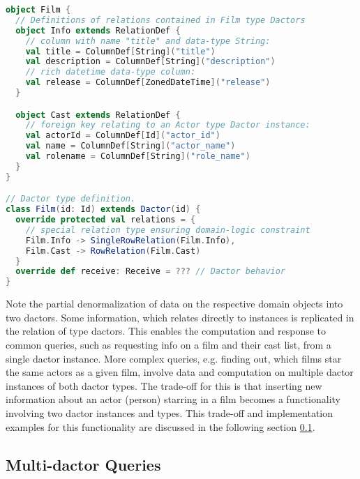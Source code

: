 \begin{lstlisting}[caption=Film Dactor type definition using the actordb framework, label=lst:film_definition, language=Scala]
object Film {
  // Definitions of relations contained in Film type Dactors
  object Info extends RelationDef {
    // column with name "title" and data-type String:
    val title = ColumnDef[String]("title")
    val description = ColumnDef[String]("description")
    // rich datetime data-type column:
    val release = ColumnDef[ZonedDateTime]("release")
  }

  object Cast extends RelationDef {
    // foreign key relating to an Actor type Dactor instance:
    val actorId = ColumnDef[Id]("actor_id")
    val name = ColumnDef[String]("actor_name")
    val rolename = ColumnDef[String]("role_name")
  }
} 

// Dactor type definition.
class Film(id: Id) extends Dactor(id) {
  override protected val relations = {
    // special relation type ensuring domain-logic constraint
    Film.Info -> SingleRowRelation(Film.Info),
    Film.Cast -> RowRelation(Film.Cast)
  }
  override def receive: Receive = ??? // Dactor behavior
}
\end{lstlisting}
%

Note the partial denormalization of data on the respective domain objects into two \glspl{dactor}.
Some information, which relates directly to  instances is replicated in the  relation of  type \glspl{dactor}.
This enables the computation and response to common queries, such as requesting info on a film and their cast list, from a single \gls{dactor} instance.
More complex queries, e.g. finding out, which films star the same actors as a given film, involve data and computation on multiple \gls{dactor} instances of both \gls{dactor} types.
The trade-off for this is that inserting new information about an actor (person) starring in a film becomes a functionality involving two \gls{dactor} instances and types.
This trade-off and implementation examples for this functionality are discussed in the following section \ref{subsec:multi_dactor_queries}.


\subsection[Multi-Dactor Queries]{Multi-\Gls{dactor} Queries}\label{subsec:multi_dactor_queries}

